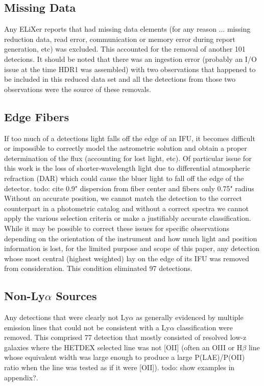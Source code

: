 \documentclass{aastex62}
\begin{document}
 \subsection{Missing Data}
 Any ELiXer reports that had missing data elements (for any reason ... missing reduction data, read error, communication or memory error during report generation, etc) was excluded. This accounted for the removal of another 101 detecions. It should be noted that there was an ingestion error (probably an I/O issue at the time HDR1 was assembled) with two observations that happened to be included in this reduced data set and all the detections from those two observations were the source of these removals. 
 
\subsection{Edge Fibers}
If too much of a detections light falls off the edge of an IFU, it becomes difficult or impossible to correctly model the astrometric solution and obtain a proper determination of the flux (accounting for lost light, etc). Of particular issue for this work is the loss of shorter-wavelength light due to differential atmospheric refraction (DAR) which could cause the bluer light to fall off the edge of the detector. { \color{red} todo: cite 0.9" dispersion from fiber center and fibers only 0.75" radius} Without an accurate position, we cannot match the detection to the correct counterpart in a photometric catalog and without a correct spectra we cannot apply the various selection criteria or make a justifiably accurate classification. While it may be possible to correct these issues for specific observations depending on the orientation of the instrument and how much light and position information is lost, for the limited purpose and scope of this paper, any detection whose most central (highest weighted) lay on the edge of its IFU was removed from consideration. This condition eliminated 97 detections. 

\subsection{Non-Ly$\alpha$ Sources}
Any detections that were clearly not Ly$\alpha$ as generally evidenced by multiple emission lines that could not be consistent with a Ly$\alpha$ classification were removed. This comprised 77 detection that mostly consisted of resolved low-z galaxies where the HETDEX selected line was not [OII] (often an OIII or H$\beta$ line whose equivalent width was large enough to produce a large P(LAE)/P(OII) ratio when the line was tested as if it were [OII]).
{ \color{red} todo: show examples in appendix?}.  
\end{document}
